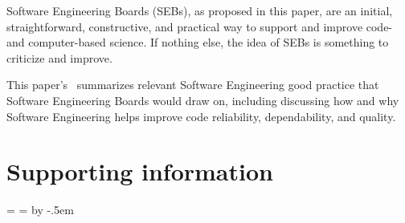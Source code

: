 \documentclass{comjnl}
\begin{document}
Software Engineering Boards (SEBs), as proposed in this paper, are an initial, straightforward, constructive, and practical way to support and improve code- and computer-based science. If nothing else, the idea of SEBs is something to criticize and improve.

This paper's \supplement\ summarizes relevant Software Engineering good practice that Software Engineering Boards would draw on, including discussing how and why Software Engineering helps improve code reliability, dependability, and quality.

\section*{Supporting information}
\newcount\csrefcount {}
\def\csref{\global\advance\csrefcount by 1}
\long{}
\long{}

\newdimen\saveparindent \saveparindent=\parindent
\newdimen\highlightwidth \highlightwidth=\columnwidth
\advance \highlightwidth by -.5em

\long{}
\long{}

\long{}
\long{}
\long{}
\end{document}
